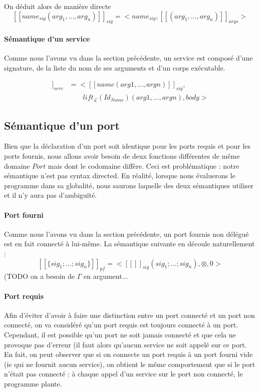 \documentclass[11pt,a4paper,fleqn]{report}
\begin{document}
On déduit alors de manière directe
\[[\![name_{sig}(arg_1,...,arg_n)]\!]_{sig} = <name_{sig}, [\![(arg_1,...,arg_n)]\!]_{args}> \]

\paragraph{Sémantique d'un service}
Comme nous l'avons vu dans la section précédente, un service est composé d'une signature, de la liste du nom de ses arguments et d'un corps exécutable.

\begin{align*}
[\![service~name(arg1,...,argn)\{
	body
	\}
]\!]_{serv}&= <[\![name(arg1,...,argn)]\!]_{sig},\\
&\qquad  lift_{\mathcal{L}}(Id_{Name})(arg1,...,argn), body>
\end{align*}

\subsection{Sémantique d'un port}
Bien que la déclaration d'un port soit identique pour les ports requis et pour les ports fournis, nous allons avoir besoin de deux fonctions différentes de même domaine $Port$ mais dont le codomaine diffère. Ceci est problématique : notre sémantique n'est pas syntax directed. En réalité, lorsque nous évaluerons le programme dans sa globalité, nous saurons laquelle des deux sémantiques utiliser et il n'y aura pas d'ambiguïté.

\paragraph{Port fourni} Comme nous l'avons vu dans la section précédente, un port fournis non délégué est en fait connecté à lui-même. La sémantique suivante en découle naturellement : 
\[[\![\{sig_1; ... ; sig_n\}]\!]_{pf} = <[\![]\!]_{sig}(sig_1; ... ; sig_n), \otimes, 0>
\]
(TODO on a besoin de $\Gamma$ en argument...

\paragraph{Port requis}
Afin d'éviter d'avoir à faire une distinction entre un port connecté et un port non connecté, on va considéré qu'un port requis est toujours connecté à un port. Cependant, il est possible qu'un port ne soit jamais connecté et que cela ne provoque pas d'erreur (il faut alors qu'aucun service ne soit appelé sur ce port. En fait, on peut observer que si on connecte un port requis à un port fourni vide (ie qui ne fournit aucun service), on obtient le même comportement que si le port n'était pas connecté : à chaque appel d'un service sur le port non connecté, le programme plante.
\end{document}
